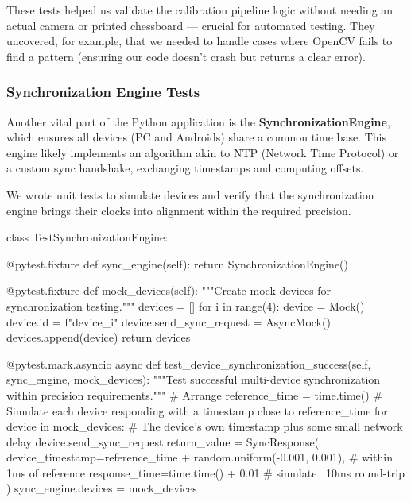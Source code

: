 These tests helped us validate the calibration pipeline logic without
needing an actual camera or printed chessboard --- crucial for automated
testing. They uncovered, for example, that we needed to handle cases
where OpenCV fails to find a pattern (ensuring our code doesn't crash
but returns a clear error).

\subsubsection{Synchronization Engine Tests}

Another vital part of the Python application is the
\textbf{SynchronizationEngine}, which ensures all devices (PC and Androids)
share a common time base. This engine likely implements an algorithm
akin to NTP (Network Time Protocol) or a custom sync handshake,
exchanging timestamps and computing offsets.

We wrote unit tests to simulate devices and verify that the
synchronization engine brings their clocks into alignment within the
required precision.

    class TestSynchronizationEngine:

        @pytest.fixture
        def sync_engine(self):
            return SynchronizationEngine()

        @pytest.fixture
        def mock_devices(self):
            """Create mock devices for synchronization testing."""
            devices = []
            for i in range(4):
                device = Mock()
                device.id = f"device_{i}"
                device.send_sync_request = AsyncMock()
                devices.append(device)
            return devices

        @pytest.mark.asyncio
        async def test_device_synchronization_success(self, sync_engine, mock_devices):
            """Test successful multi-device synchronization within precision requirements."""
            # Arrange
            reference_time = time.time()
            # Simulate each device responding with a timestamp close to reference_time
            for device in mock_devices:
                # The device's own timestamp plus some small network delay
                device.send_sync_request.return_value = SyncResponse(
                    device_timestamp=reference_time + random.uniform(-0.001, 0.001),  # within 1ms of reference
                    response_time=time.time() + 0.01  # simulate ~10ms round-trip
                )
            sync_engine.devices = mock_devices

